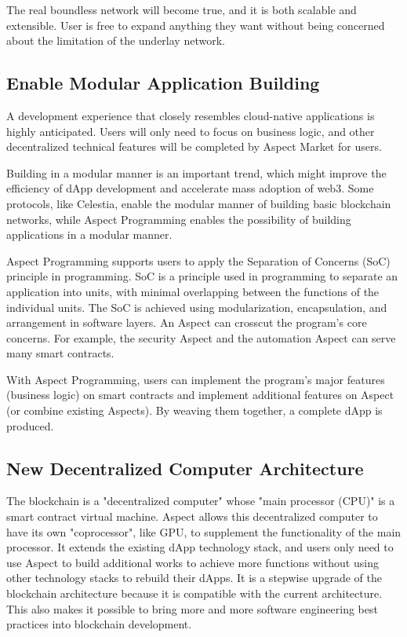 The real boundless network will become true, and it is both scalable and extensible. User is free to expand anything they want without being concerned about the limitation of the underlay network.

\subsection{Enable Modular Application Building}

A development experience that closely resembles cloud-native applications is highly anticipated. Users will only need to focus on business logic, and other decentralized technical features will be completed by Aspect Market for users.

Building in a modular manner is an important trend, which might improve the efficiency of dApp development and accelerate mass adoption of web3. Some protocols, like Celestia, enable the modular manner of building basic blockchain networks, while Aspect Programming enables the possibility of building applications in a modular manner.

Aspect Programming supports users to apply the Separation of Concerns (SoC) principle in programming. SoC is a principle used in programming to separate an application into units, with minimal overlapping between the functions of the individual units. The SoC is achieved using modularization, encapsulation, and arrangement in software layers. An Aspect can crosscut the program's core concerns. For example, the security Aspect and the automation Aspect can serve many smart contracts.

With Aspect Programming, users can implement the program's major features (business logic) on smart contracts and implement additional features on Aspect (or combine existing Aspects). By weaving them together, a complete dApp is produced.

\subsection{New Decentralized Computer Architecture}

The blockchain is a "decentralized computer" whose "main processor (CPU)" is a smart contract virtual machine. Aspect allows this decentralized computer to have its own "coprocessor", like GPU, to supplement the functionality of the main processor. It extends the existing dApp technology stack, and users only need to use Aspect to build additional works to achieve more functions without using other technology stacks to rebuild their dApps. It is a stepwise upgrade of the blockchain architecture because it is compatible with the current architecture. This also makes it possible to bring more and more software engineering best practices into blockchain development.
